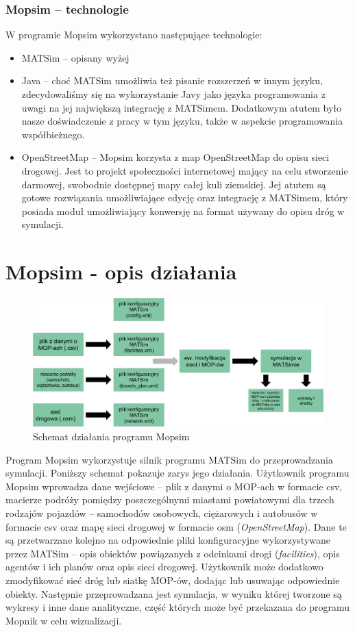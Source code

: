 \subsubsection{Mopsim -- technologie}
W programie Mopsim wykorzystano następujące technologie:
\begin{itemize}
\item MATSim -- opisany wyżej
\item Java -- choć MATSim umożliwia też pisanie rozszerzeń w innym języku, zdecydowaliśmy się na wykorzystanie Javy jako języka programowania z uwagi na jej największą integrację z MATSimem. Dodatkowym atutem było nasze doświadczenie z pracy w tym języku, także w aspekcie programowania współbieżnego.
\item OpenStreetMap -- Mopsim korzysta z map OpenStreetMap do opisu sieci drogowej. Jest to projekt społeczności internetowej mający na celu stworzenie darmowej, swobodnie dostępnej mapy całej kuli ziemskiej. Jej atutem są gotowe rozwiązania umożliwiające edycję oraz integrację z MATSimem, który posiada moduł umożliwiający konwersję na format używany do opisu dróg w symulacji.
\end{itemize}
\section{Mopsim - opis działania}
    \begin{figure}[h]
        \caption{Schemat działania programu Mopsim}
        \includegraphics[width=\textwidth]{images/mopsim/mopsim-workflow.png}
    \end{figure}
Program Mopsim wykorzystuje silnik programu MATSim do przeprowadzania symulacji. Poniższy schemat pokazuje zarys jego działania. Użytkownik programu Mopsim wprowadza dane wejściowe -- plik z danymi o MOP-ach w formacie csv, macierze podróży pomiędzy poszczególnymi miastami powiatowymi dla trzech rodzajów pojazdów -- samochodów osobowych, ciężarowych i autobusów w formacie csv oraz mapę sieci drogowej w formacie osm (\textit{OpenStreetMap}). Dane te są przetwarzane kolejno na odpowiednie pliki konfiguracyjne wykorzystywane przez MATSim -- opis obiektów powiązanych z odcinkami drogi (\textit{facilities}), opis agentów i ich planów oraz opis sieci drogowej. Użytkownik może dodatkowo zmodyfikować sieć dróg lub siatkę MOP-ów, dodając lub usuwając odpowiednie obiekty. Następnie przeprowadzana jest symulacja, w wyniku której tworzone są wykresy i inne dane analityczne, część których może być przekazana do programu Mopnik w celu wizualizacji.


